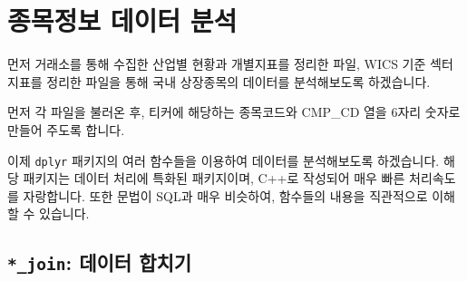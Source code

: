 \documentclass[12pt,]{book}
\newenvironment{Shaded}{\begin{snugshade}}{\end{snugshade}}
\newcommand{\DataTypeTok}[1]{\textcolor[rgb]{0.13,0.29,0.53}{#1}}
\newcommand{\DecValTok}[1]{\textcolor[rgb]{0.00,0.00,0.81}{#1}}
\newcommand{\KeywordTok}[1]{\textcolor[rgb]{0.13,0.29,0.53}{\textbf{#1}}}
\newcommand{\NormalTok}[1]{#1}
\newcommand{\OperatorTok}[1]{\textcolor[rgb]{0.81,0.36,0.00}{\textbf{#1}}}
\newcommand{\OtherTok}[1]{\textcolor[rgb]{0.56,0.35,0.01}{#1}}
\newcommand{\StringTok}[1]{\textcolor[rgb]{0.31,0.60,0.02}{#1}}
\begin{document}
\hypertarget{section-39}{%
\section{종목정보 데이터 분석}\label{section-39}}

먼저 거래소를 통해 수집한 산업별 현황과 개별지표를 정리한 파일, WICS 기준 섹터지표를 정리한 파일을 통해 국내 상장종목의 데이터를 분석해보도록 하겠습니다.

\begin{Shaded}
\end{Shaded}

먼저 각 파일을 불러온 후, 티커에 해당하는 종목코드와 CMP\_CD 열을 6자리 숫자로 만들어 주도록 합니다.

이제 \texttt{dplyr} 패키지의 여러 함수들을 이용하여 데이터를 분석해보도록 하겠습니다. 해당 패키지는 데이터 처리에 특화된 패키지이며, C++로 작성되어 매우 빠른 처리속도를 자랑합니다. 또한 문법이 SQL과 매우 비슷하여, 함수들의 내용을 직관적으로 이해할 수 있습니다.

\hypertarget{join--}{%
\subsection{\texorpdfstring{\texttt{*\_join}: 데이터 합치기}{*\_join: 데이터 합치기}}\label{join--}}
\end{document}
